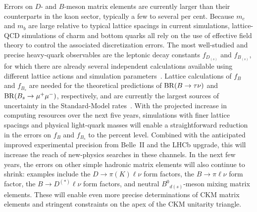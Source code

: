 \begin{itemize}
Errors on $D$- and $B$-meson matrix elements are currently larger than their
counterparts in the kaon sector, typically a few to several per cent.  Because
$m_c$ and $m_b$ are large relative to typical lattice spacings in current
simulations, lattice-QCD simulations of charm and bottom quarks all rely on
the use of effective field theory to control the associated discretization
errors.  The most well-studied and precise heavy-quark observables are the
leptonic decay constants $f_{D_{(s)}}$ and $f_{B_{(s)}}$, for which there are
already several independent calculations available using different lattice
actions and simulation
parameters~\cite{Namekawa:2011wt,Dimopoulos:2011gx,Bazavov:2011aa,Na:2012kp,Na:2012iu,Bernardoni:2012ti,Bazavov:2012dg,Carrasco:2012de,Dowdall:2013tga}.
Lattice calculations of $f_B$ and $f_{B_s}$ are needed for the theoretical
predictions of ${\rm BR}(B \to \tau \nu)$ and ${\rm BR}(B_s \to \mu^+ \mu^-)$,
respectively, and are currently the largest sources of uncertainty in the
Standard-Model rates~\cite{Buras:2012ru}.  With the projected increase in
computing resources over the next five years, simulations with finer lattice
spacings and physical light-quark masses will enable a straightforward
reduction in the errors on $f_B$ and $f_{B_s}$ to the percent level.  Combined
with the anticipated improved experimental precision from Belle~II and the
LHCb upgrade, this will increase the reach of new-physics searches in these
channels.  In the next few years, the errors on other simple hadronic matrix
elements will also continue to shrink: examples include the $D \to \pi(K) \ell
\nu$ form factors, the $B \to \pi \ell \nu$ form factor, the $B\to
D^{(*)}\ell\nu$ form factors, and neutral ${B^0}_{d(s)}$-meson mixing matrix
elements.  These will enable even more precise determinations of CKM matrix
elements and stringent constraints on the apex of the CKM unitarity triangle.


\end{itemize}
